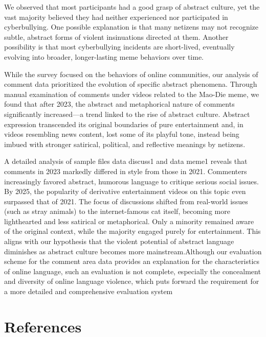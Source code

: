 \documentclass[12pt,a4paper]{ctexart}
\theoremstyle{MyLineTheoremStyle}
\theoremstyle{MyBlockTheoremStyle}
\theoremstyle{MySubsubsectionStyle}
\begin{document}
We observed that most participants had a good grasp of abstract culture, yet the vast majority believed they had neither experienced nor participated in cyberbullying. One possible explanation is that many netizens may not recognize subtle, abstract forms of violent insinuations directed at them. Another possibility is that most cyberbullying incidents are short-lived, eventually evolving into broader, longer-lasting meme behaviors over time.

While the survey focused on the behaviors of online communities, our analysis of comment data prioritized the evolution of specific abstract phenomena. Through manual examination of comments under videos related to the Mao-Die meme, we found that after 2023, the abstract and metaphorical nature of comments significantly increased—a trend linked to the rise of abstract culture. Abstract expression transcended its original boundaries of pure entertainment and, in videos resembling news content, lost some of its playful tone, instead being imbued with stronger satirical, political, and reflective meanings by netizens.

A detailed analysis of sample files data discuss1 and data meme1 reveals that comments in 2023 markedly differed in style from those in 2021. Commenters increasingly favored abstract, humorous language to critique serious social issues. By 2025, the popularity of derivative entertainment videos on this topic even surpassed that of 2021. The focus of discussions shifted from real-world issues (such as stray animals) to the internet-famous cat itself, becoming more lighthearted and less satirical or metaphorical. Only a minority remained aware of the original context, while the majority engaged purely for entertainment. This aligns with our hypothesis that the violent potential of abstract language diminishes as abstract culture becomes more mainstream.Although our evaluation scheme for the comment area data provides an explanation for the characteristics of online language, such an evaluation is not complete, especially the concealment and diversity of online language violence, which puts forward the requirement for a more detailed and comprehensive evaluation system

\section{References}
\end{document}
